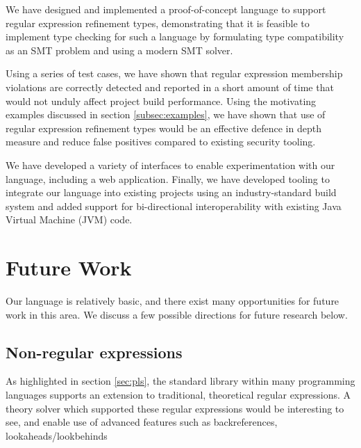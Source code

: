 \documentclass[a4paper,openany,12pt]{book}
\begin{document}
We have designed and implemented a proof-of-concept language to support regular expression refinement types,
demonstrating that it is feasible to implement type checking for such a language by formulating type compatibility
as an SMT problem and using a modern SMT solver.

Using a series of test cases, we have shown that regular expression membership violations are correctly detected
and reported in a short amount of time that would not unduly affect project build performance.
Using the motivating examples discussed in section \ref{subsec:examples}, we have shown that use of regular expression
refinement types would be an effective defence in depth measure and reduce false positives compared to existing security
tooling.

We have developed a variety of interfaces to enable experimentation with our language, including a web application.
Finally, we have developed tooling to integrate our language into existing projects using an industry-standard build
system and added support for bi-directional interoperability with existing Java Virtual Machine (JVM) code.

\chapter{Future Work}\label{ch:future-work}

Our language is relatively basic, and there exist many opportunities for future work in this area.
We discuss a few possible directions for future research below.

\section{Non-regular expressions}

As highlighted in section \ref{sec:pls}, the standard library within many programming languages supports an extension to traditional, theoretical regular expressions.
A theory solver which supported these regular expressions would be interesting to see, and enable use of advanced features such as backreferences, lookaheads/lookbehinds

\end{document}
